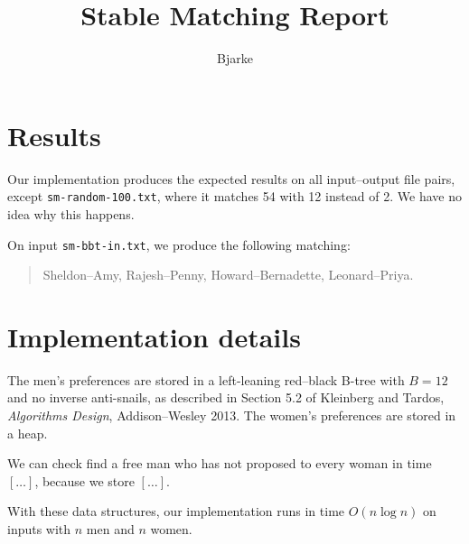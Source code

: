 \documentclass{tufte-handout}
\title{Stable Matching Report}
\author{Bjarke}
\begin{document}
  \maketitle

  \section{Results}

  Our implementation produces the expected results on all input--output file pairs, except {\tt sm-random-100.txt}, where it matches 54 with 12 instead of 2.
  We have no idea why this happens.%

  On input {\tt sm-bbt-in.txt}, we produce the following matching:
  \begin{quotation}
    Sheldon--Amy, Rajesh--Penny, Howard--Bernadette, Leonard--Priya.  
  \end{quotation}

  \section{Implementation details}

  The men's preferences are stored in a left-leaning red--black B-tree with $B=12$ and no inverse anti-snails,%
   as described in Section 5.2 of Kleinberg and Tardos, \emph{Algorithms Design}, Addison--Wesley 2013.%
  The women's preferences are stored in a heap.

  We can check find a free man who has not proposed to every woman in time $[\ldots]$,
  because we store $[\ldots]$.

  With these data structures, our implementation runs in time $O(n\log n)$  
  on inputs with $n$ men and $n$ women.
\end{document}
